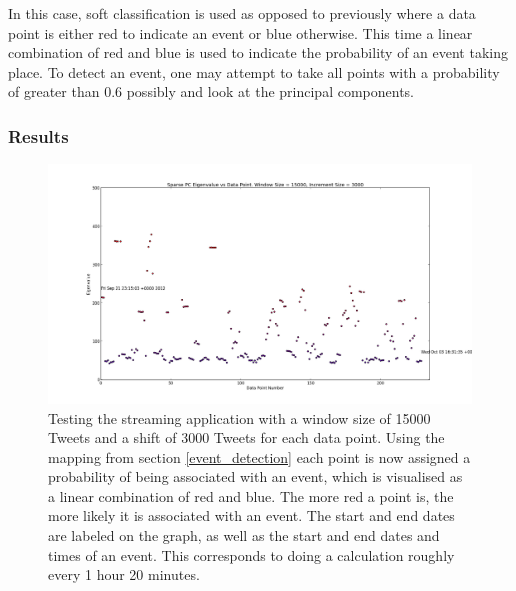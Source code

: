 \documentclass[11pt,a4paper]{article}
\begin{document}
In this case, soft classification is used as opposed to previously where a data point is either red to indicate an event or blue otherwise. This time a linear combination of red and blue is used to indicate the probability of an event taking place. To detect an event, one may attempt to take all points with a probability of greater than 0.6 possibly and look at the principal components.

\subsubsection{Results}
\begin{figure}[H]
\centering
\includegraphics[scale=0.30]{Twitter_Data_All_Graph.png}
\caption{Testing the streaming application with a window size of 15000 Tweets and a shift of 3000 Tweets for each data point. Using the mapping from section \ref{event_detection} each point is now assigned a probability of being associated with an event, which is visualised as a linear combination of red and blue. The more red a point is, the more likely it is associated with an event. The start and end dates are labeled on the graph, as well as the start and end dates and times of an event. This corresponds to doing a calculation roughly every 1 hour 20 minutes.}
\label{testing_app_all_data}
\end{figure}
\end{document}
